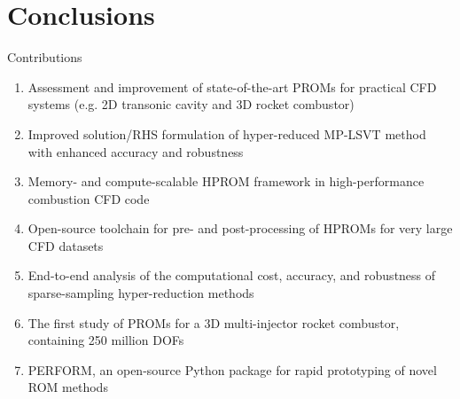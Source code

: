 \documentclass[]{beamer}
\begin{document}
\section*{Conclusions}

\begin{frame}{Contributions}
    \begin{enumerate}
        \item Assessment and improvement of state-of-the-art PROMs for practical CFD systems (e.g. 2D transonic cavity and 3D rocket combustor)
        \item Improved solution/RHS formulation of hyper-reduced MP-LSVT method with enhanced accuracy and robustness
        \item Memory- and compute-scalable HPROM framework in high-performance combustion CFD code
        \item Open-source toolchain for pre- and post-processing of HPROMs for very large CFD datasets
        \item End-to-end analysis of the computational cost, accuracy, and robustness of sparse-sampling hyper-reduction methods
        \item The first study of PROMs for a 3D multi-injector rocket combustor, containing 250 million DOFs
        \item PERFORM, an open-source Python package for rapid prototyping of novel ROM methods
    \end{enumerate}
\end{frame}
\end{document}
